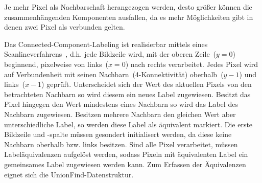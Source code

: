 %
Je mehr Pixel als Nachbarschaft herangezogen werden, desto größer können die zusammenhängenden Komponenten ausfallen, da es mehr Möglichkeiten gibt in denen zwei Pixel als verbunden gelten.

Das Connected-Component-Labeling ist realisierbar mittels eines Scanlineverfahrens~\cite[S.~69--75]{compvis2001}, d.h. jede Bildzeile wird, mit der oberen Zeile~($y=0$) beginnend, pixelweise von links~($x=0$) nach rechts verarbeitet.
Jedes Pixel wird auf Verbundenheit mit seinen Nachbarn~(4-Konnektivität) oberhalb~($y-1$) und links~($x-1$) geprüft.
Unterscheidet sich der Wert des aktuellen Pixels von den betrachteten Nachbarn so wird diesem ein neues Label zugewiesen.
Besitzt das Pixel hingegen den Wert mindestens eines Nachbarn so wird das Label des Nachbarn zugewiesen.
Besitzen mehrere Nachbarn den gleichen Wert aber unterschiedliche Label, so werden diese Label als äquivalent markiert.
Die erste Bildzeile und -spalte müssen gesondert initialisert werden, da diese keine Nachbarn oberhalb bzw. links besitzen.
Sind alle Pixel verarbeitet, müssen Labeläquivalenzen aufgelöst werden, sodass Pixeln mit äquivalenten Label ein gemeinsames Label zugewiesen werden kann. Zum Erfassen der Äquivalenzen eignet sich die UnionFind-Datenstruktur.
%
